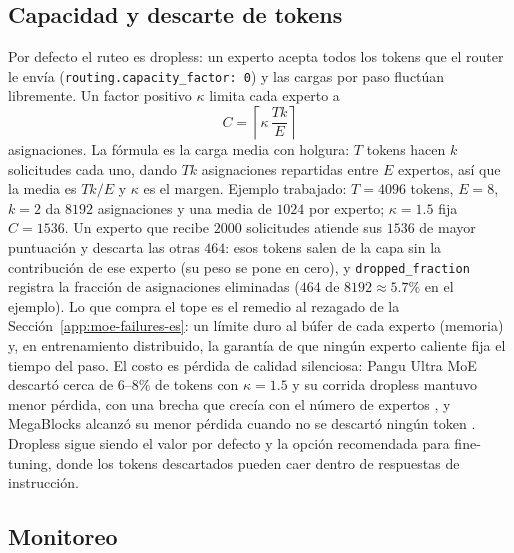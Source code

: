 \subsection{Capacidad y descarte de tokens}
\label{app:moe-capacity-es}

Por defecto el ruteo es dropless: un experto acepta todos los tokens que el
router le envía (\texttt{routing.capacity\_factor: 0}) y las cargas por paso
fluctúan libremente. Un factor positivo $\kappa$ limita cada experto a
\begin{equation}
  C = \left\lceil \kappa\,\frac{Tk}{E} \right\rceil
\end{equation}
asignaciones. La fórmula es la carga media con holgura: $T$ tokens hacen $k$
solicitudes cada uno, dando $Tk$ asignaciones repartidas entre $E$ expertos,
así que la media es $Tk/E$ y $\kappa$ es el margen. Ejemplo trabajado:
$T = 4096$ tokens, $E = 8$, $k = 2$ da $8192$ asignaciones y una media de
$1024$ por experto; $\kappa = 1.5$ fija $C = 1536$. Un experto que recibe
$2000$ solicitudes atiende sus $1536$ de mayor puntuación y descarta las
otras $464$: esos tokens salen de la capa sin la contribución de ese experto
(su peso se pone en cero), y \texttt{dropped\_fraction} registra la fracción
de asignaciones eliminadas ($464$ de $8192 \approx 5.7\%$ en el ejemplo). Lo
que compra el tope es el remedio al rezagado de la
Sección~\ref{app:moe-failures-es}: un límite duro al búfer de cada experto
(memoria) y, en entrenamiento distribuido, la garantía de que ningún experto
caliente fija el tiempo del paso. El costo es pérdida de calidad silenciosa:
Pangu Ultra MoE descartó cerca de 6--8\% de tokens con $\kappa = 1.5$ y su
corrida dropless mantuvo menor pérdida, con una brecha que crecía con el
número de expertos \citep{pangu2025ultra}, y MegaBlocks alcanzó su menor
pérdida cuando no se descartó ningún token \citep{gale2022megablocks}. Dropless
sigue siendo el valor por defecto y la opción recomendada para fine-tuning,
donde los tokens descartados pueden caer dentro de respuestas de instrucción.

\subsection{Monitoreo}
\label{app:moe-monitoring-es}

